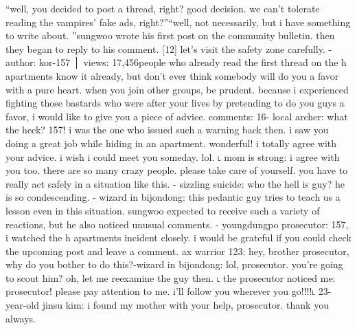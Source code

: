 “well, you decided to post a thread, right? good decision.
 we can’t tolerate reading the vampires’ fake ads, right?”“well, not necessarily, but i have something to write about.
”sungwoo wrote his first post on the community bulletin.
 then they began to reply to his comment.
[12] let’s visit the safety zone carefully.
-author: kor-157 │ views: 17,456people who already read the first thread on the h apartments know it already, but don’t ever think somebody will do you a favor with a pure heart.
 when you join other groups, be prudent.
because i experienced fighting those bastards who were after your lives by pretending to do you guys a favor, i would like to give you a piece of advice.
comments: 16- local archer: what the heck? 157! i was the one who issued such a warning back then.
 i saw you doing a great job while hiding in an apartment.
 wonderful! i totally agree with your advice.
 i wish i could meet you someday.
 lol.
˪ mom is strong: i agree with you too.
 there are so many crazy people.
 please take care of yourself.
 you have to really act safely in a situation like this.
- sizzling suicide: who the hell is guy? he is so condescending.
- wizard in bijondong: this pedantic guy tries to teach us a lesson even in this situation.
sungwoo expected to receive such a variety of reactions, but he also noticed unusual comments.
- youngdungpo prosecutor: 157, i watched the h apartments incident closely.
 i would be grateful if you could check the upcoming post and leave a comment.
ax warrior 123: hey, brother prosecutor, why do you bother to do this?-wizard in bijondong: lol, prosecutor.
 you’re going to scout him? oh, let me reexamine the guy then.
˪ the prosecutor noticed me: prosecutor! please pay attention to me.
 i’ll follow you wherever you go!!!!˪ 23-year-old jinsu kim: i found my mother with your help, prosecutor.
 thank you always.


 